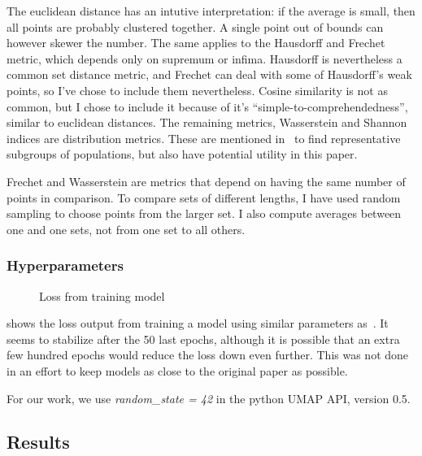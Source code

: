 \documentclass[10pt,twocolumn,letterpaper]{article}
\begin{document}
The euclidean distance has an intutive interpretation: if the average is small, then all points are probably clustered together. A single point out of bounds can however skewer the number. The same applies to the Hausdorff and Frechet metric, which depends only on supremum or infima. Hausdorff is nevertheless a common set distance metric, and Frechet can deal with some of Hausdorff's weak points, so I've chose to include them nevertheless. Cosine similarity is not as common, but I chose to include it because of it's ``simple-to-comprehendedness'', similar to euclidean distances. The remaining metrics, Wasserstein and Shannon indices are distribution metrics. These are mentioned in~\cite{datarepresentativity} to find representative subgroups of populations, but also have potential utility in this paper. 

Frechet and Wasserstein are metrics that depend on having the same number of points in comparison. To compare sets of different lengths, I have used random sampling to choose points from the larger set. I also compute averages between one and one sets, not from one set to all others.

\subsubsection{Hyperparameters}

\begin{figure}\label{fig:loss}
\caption{Loss from training model}
\label{fig:defaultLoss}
\end{figure}

 shows the loss output from training a model using similar parameters as~\cite{sslUMAP}. It seems to stabilize after the 50 last epochs, although it is possible that an extra few hundred epochs would reduce the loss down even further. This was not done in an effort to keep models as close to the original paper as possible.

For our work, we use \textit{random\_state = 42} in the python \gls{UMAP} API, version 0.5.

\subsection{Results}\label{sec:results}
\end{document}
